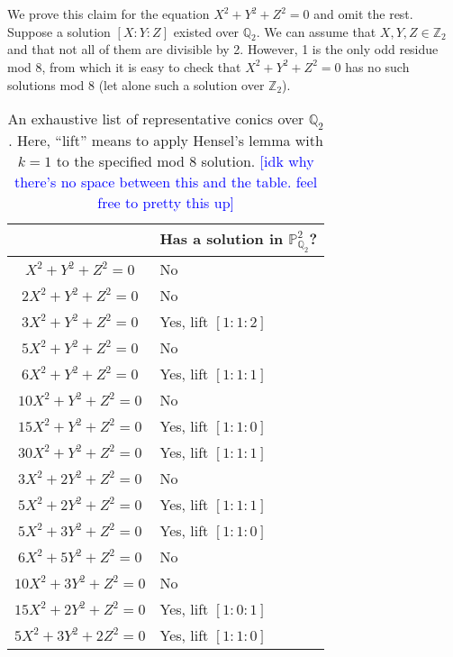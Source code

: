 \documentclass[10pt,a4paper]{amsart}
\numberwithin{equation}{section}
\numberwithin{figure}{section}
\numberwithin{table}{section}
\theoremstyle{definition}
\theoremstyle{plain}
\theoremstyle{remark}
\theoremstyle{plain}
\theoremstyle{definition}
\theoremstyle{plain}
\theoremstyle{plain}
\renewcommand{\P}{\mathbb{P}}
\newcommand{\Z}{\mathbb{Z}}
\newcommand{\Q}{\mathbb{Q}}
\begin{document}
	We prove this claim for the equation $X^2 + Y^2 + Z^2 = 0$ and omit the rest. Suppose a solution $[X:Y:Z]$ existed over $\Q_2$. We can assume that $X,Y,Z\in \Z_2$ and that not all of them are divisible by 2. However, 1 is the only odd residue mod 8, from which it is easy to check that $X^2 + Y^2 + Z^2 = 0$ has no such solutions mod 8 (let alone such a solution over $\Z_2$).
	\begin{table}[h]
		\begin{tabular}{|c|l|}
			\hline
			& Has a solution in $\P^2_{\Q_2}$?\\
			\hline
			\hline 
			$X^2 + Y^2 + Z^2 = 0$ & No \\ 
			\hline 
			$2X^2 + Y^2 + Z^2 = 0$ & No \\ 
			\hline 
			$3X^2 + Y^2 + Z^2 = 0$ & Yes, lift $[1:1:2]$ \\ 
			\hline 
			$5X^2 + Y^2 + Z^2 = 0$ & No \\ 
			\hline 
			$6X^2 + Y^2 + Z^2 = 0$ & Yes, lift $[1:1:1]$ \\ 
			\hline 
			$10X^2 + Y^2 + Z^2 = 0$ & No \\ 
			\hline 
			$15X^2 + Y^2 + Z^2 = 0$ & Yes, lift $[1:1:0]$ \\ 
			\hline 
			$30X^2 + Y^2 + Z^2 = 0$ & Yes, lift $[1:1:1]$ \\ 
			\hline 
			$3X^2 + 2Y^2 + Z^2 = 0$ & No \\ 
			\hline 
			$5X^2 + 2Y^2 + Z^2 = 0$ & Yes, lift $[1:1:1]$ \\ 
			\hline 
			$5X^2 + 3Y^2 + Z^2 = 0$ & Yes, lift $[1:1:0]$ \\ 
			\hline 
			$6X^2 + 5Y^2 + Z^2 = 0$ & No \\ 
			\hline 
			$10X^2 + 3Y^2 + Z^2 = 0$ & No \\ 
			\hline 
			$15X^2 + 2Y^2 + Z^2 = 0$ & Yes, lift $[1:0:1]$ \\ 
			\hline 
			$5X^2 + 3Y^2 + 2Z^2 = 0$ & Yes, lift $[1:1:0]$ \\ 
			\hline 
		\end{tabular}
		\caption{An exhaustive list of representative conics over $\Q_2$. Here, ``lift'' means to apply Hensel's lemma with $k=1$ to the specified mod 8 solution.
		\textcolor{blue}{[idk why there's no space between this and the table. feel free to pretty this up]}} \label{table:Q2-diag-conics}
	\end{table}
\end{document}
